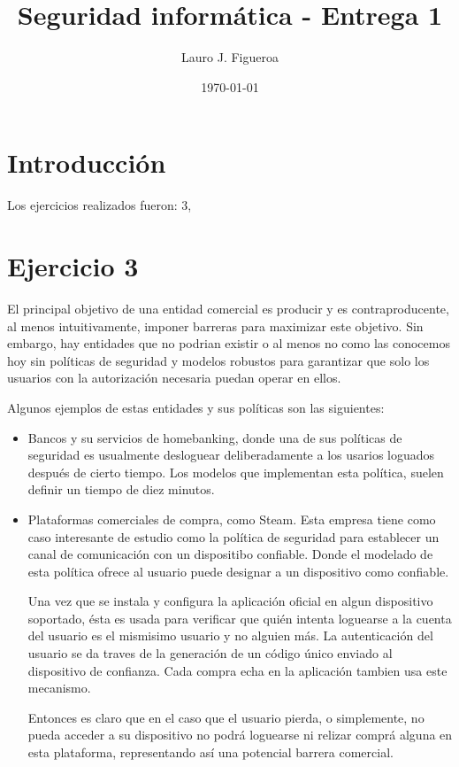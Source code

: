 \documentclass[12pt]{article}%
\begin{document}
\title{Seguridad informática - Entrega 1}
\author{Lauro J. Figueroa}
\date{\today}
\maketitle
\section*{Introducción}
Los ejercicios realizados fueron: 3, 

\section*{Ejercicio 3}
El principal objetivo de una entidad comercial es producir y es
contraproducente, al menos intuitivamente, imponer barreras para
maximizar este objetivo. Sin embargo, hay entidades que no podrian
existir o al menos no como las conocemos hoy sin políticas de seguridad y
modelos robustos para garantizar que solo los usuarios con la
autorización necesaria puedan operar en ellos.

Algunos ejemplos de estas entidades y sus políticas son las siguientes:
\begin{itemize}
\item Bancos y su servicios de homebanking, donde una de sus políticas
  de seguridad es usualmente desloguear deliberadamente a los usarios
  loguados después de cierto tiempo. Los modelos que implementan esta
  política, suelen definir un tiempo de diez minutos.
  
\item Plataformas comerciales de compra, como Steam. Esta empresa
  tiene como caso interesante de estudio como la política de seguridad
  para establecer un canal de comunicación con un dispositibo
  confiable. Donde el modelado de esta política ofrece al usuario
  puede designar a un dispositivo como confiable.

  Una vez que se instala y configura la aplicación oficial en algun
  dispositivo soportado, ésta es usada para verificar que quién
  intenta loguearse a la cuenta del usuario es el mismisimo usuario y
  no alguien más. La autenticación del usuario se da traves de la
  generación de un código único enviado al dispositivo de confianza.
  Cada compra echa en la aplicación tambien usa este mecanismo.

  Entonces es claro que en el caso que el usuario pierda, o
  simplemente, no pueda acceder a su dispositivo no podrá loguearse ni
  relizar comprá alguna en esta plataforma, representando así una
  potencial barrera comercial.
\end{itemize}
\end{document}
